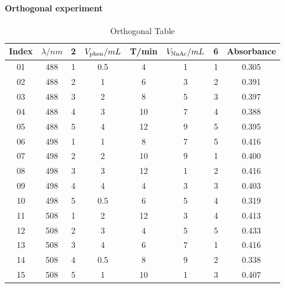 \documentclass[journal=jacsat,manuscript=article]{achemso}
\begin{document}
\paragraph{Orthogonal experiment}
\begin{table}[H]
    \caption{Orthogonal Table}
    \label{Tab.Ort}
    \begin{tabular}{cccccccc}
    \toprule
    Index & $\lambda /nm$ & 2 & $V_{\ce{phen}}/mL$ & T/min & $V_{\ce{NaAc}}/mL$ & 6 & Absorbance\\
    \midrule
    01    & 488           & 1 & 0.5                & 4     & 1                  & 1 & 0.305     \\
    02    & 488           & 2 & 1                  & 6     & 3                  & 2 & 0.391     \\
    03    & 488           & 3 & 2                  & 8     & 5                  & 3 & 0.397     \\
    04    & 488           & 4 & 3                  & 10    & 7                  & 4 & 0.388     \\
    05    & 488           & 5 & 4                  & 12    & 9                  & 5 & 0.395     \\
    06    & 498           & 1 & 1                  & 8     & 7                  & 5 & 0.416     \\
    07    & 498           & 2 & 2                  & 10    & 9                  & 1 & 0.400     \\
    08    & 498           & 3 & 3                  & 12    & 1                  & 2 & 0.416     \\
    09    & 498           & 4 & 4                  & 4     & 3                  & 3 & 0.403     \\
    10    & 498           & 5 & 0.5                & 6     & 5                  & 4 & 0.319     \\
    11    & 508           & 1 & 2                  & 12    & 3                  & 4 & 0.413     \\
    12    & 508           & 2 & 3                  & 4     & 5                  & 5 & 0.433     \\
    13    & 508           & 3 & 4                  & 6     & 7                  & 1 & 0.416     \\
    14    & 508           & 4 & 0.5                & 8     & 9                  & 2 & 0.338     \\
    15    & 508           & 5 & 1                  & 10    & 1                  & 3 & 0.407     \\

\end{tabular}
\end{table}
\end{document}
